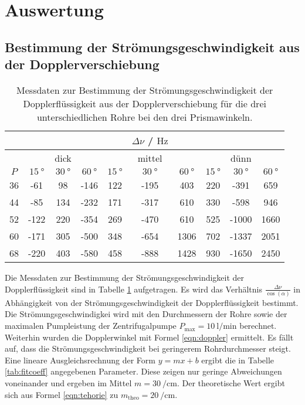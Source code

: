 \section{Auswertung}
\label{sec:Auswertung}
\subsection{Bestimmung der Strömungsgeschwindigkeit aus der Dopplerverschiebung}
\begin{table}
	\centering
	\caption{Messdaten zur Bestimmung der Strömungsgeschwindigkeit der Dopplerflüssigkeit aus der Dopplerverschiebung für die drei unterschiedlichen Rohre bei den drei Prismawinkeln.}
	\label{tab:aufgabeA}
	\begin{tabular}{cccccccccc}
		\toprule
		& & & & & $\Delta \nu$ / $\si{\hertz}$ & & & & \\
		\midrule 
		& & dick & & & mittel & & & dünn & \\
		\midrule
		$P$ & $\SI{15}{\degree}$ & $\SI{30}{\degree}$ & $\SI{60}{\degree}$ & $\SI{15}{\degree}$ & $\SI{30}{\degree}$ & $\SI{60}{\degree}$ & $\SI{15}{\degree}$ & $\SI{30}{\degree}$ & $\SI{60}{\degree}$ \\ 
		\midrule
		36 & -61 & 98 & -146 & 122 & -195 & 403 & 220 & -391 & 659 \\
		44 & -85 & 134 & -232 & 171 & -317 & 610 & 330 & -598 & 946 \\
		52 & -122 & 220 & -354 & 269 & -470 & 610 & 525 & -1000 & 1660 \\        
		60 & -171 & 305 & -500 & 348 & -654 & 1306 & 702 & -1337 & 2051 \\
		68 & -220 & 403 & -580 & 458 & -888 & 1428 & 930 & -1650 & 2450 \\
		\bottomrule
	\end{tabular}
\end{table}
Die Messdaten zur Bestimmung der Strömungsgeschwindigkeit der Dopplerflüssigkeit sind 
in Tabelle \ref{tab:aufgabeA} aufgetragen.
Es wird das Verhältnis $\frac{\Delta \nu}{\cos(\alpha)}$ in Abhängigkeit von der
Strömungsgeschwindigkeit der Dopplerflüssigkeit bestimmt. Die Strömungsgeschwindigkei
wird mit den Durchmessern der Rohre sowie der maximalen Pumpleistung der Zentrifugalpumpe 
$P_{\mathrm{max}} = \SI{10}{\litre\per\minute}$ berechnet. Weiterhin wurden die 
Dopplerwinkel mit Formel \eqref{eqn:doppler} ermittelt.
Es fällt auf, dass die Strömungsgeschwindigkeit bei geringerem Rohrdurchmesser steigt.
Eine lineare Ausgleichsrechnung der Form $y=mx+b$ ergibt die in Tabelle \ref{tab:fitcoeff} 
angegebenen Parameter. Diese zeigen nur geringe Abweichungen voneinander und ergeben im 
Mittel $m = \SI{30}{\per\centi\meter}$. Der theoretische Wert ergibt sich aus Formel 
\eqref{eqn:tehorie} zu $m_{\mathrm{theo}} = \SI{20}{\per\centi\meter}$.

